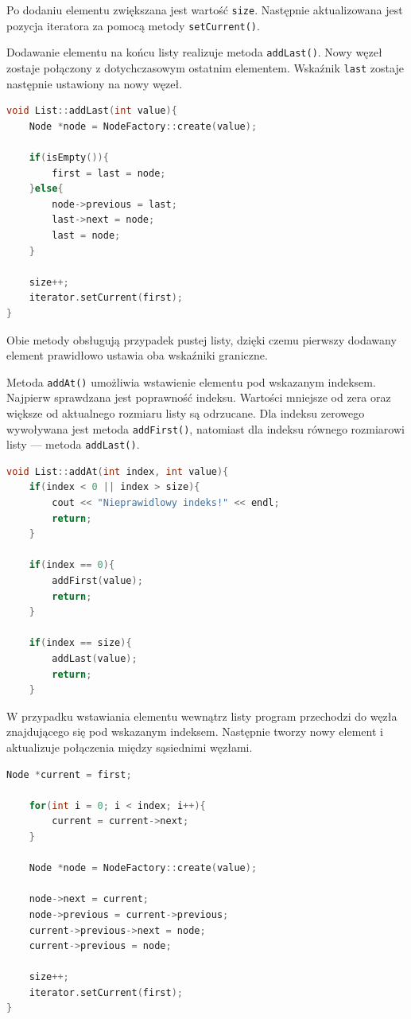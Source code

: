 Po dodaniu elementu zwiększana jest wartość \texttt{size}. Następnie aktualizowana jest pozycja iteratora za pomocą metody \texttt{setCurrent()}.

Dodawanie elementu na końcu listy realizuje metoda \texttt{addLast()}. Nowy węzeł zostaje połączony z dotychczasowym ostatnim elementem. Wskaźnik \texttt{last} zostaje następnie ustawiony na nowy węzeł.

\begin{lstlisting}[language=C++, caption={Dodawanie elementu na końcu listy}]
void List::addLast(int value){
    Node *node = NodeFactory::create(value);

    if(isEmpty()){
        first = last = node;
    }else{
        node->previous = last;
        last->next = node;
        last = node;
    }

    size++;
    iterator.setCurrent(first);
}
\end{lstlisting}

Obie metody obsługują przypadek pustej listy, dzięki czemu pierwszy dodawany element prawidłowo ustawia oba wskaźniki graniczne.

Metoda \texttt{addAt()} umożliwia wstawienie elementu pod wskazanym indeksem. Najpierw sprawdzana jest poprawność indeksu. Wartości mniejsze od zera oraz większe od aktualnego rozmiaru listy są odrzucane. Dla indeksu zerowego wywoływana jest metoda \texttt{addFirst()}, natomiast dla indeksu równego rozmiarowi listy — metoda \texttt{addLast()}.

\begin{lstlisting}[language=C++, caption={Sprawdzanie indeksu w metodzie addAt}]
void List::addAt(int index, int value){
    if(index < 0 || index > size){
        cout << "Nieprawidlowy indeks!" << endl;
        return;
    }

    if(index == 0){
        addFirst(value);
        return;
    }

    if(index == size){
        addLast(value);
        return;
    }
\end{lstlisting}

W przypadku wstawiania elementu wewnątrz listy program przechodzi do węzła znajdującego się pod wskazanym indeksem. Następnie tworzy nowy element i aktualizuje połączenia między sąsiednimi węzłami.

\begin{lstlisting}[language=C++, caption={Wstawianie elementu wewnątrz listy}]
    Node *current = first;

    for(int i = 0; i < index; i++){
        current = current->next;
    }

    Node *node = NodeFactory::create(value);

    node->next = current;
    node->previous = current->previous;
    current->previous->next = node;
    current->previous = node;

    size++;
    iterator.setCurrent(first);
}
\end{lstlisting}


